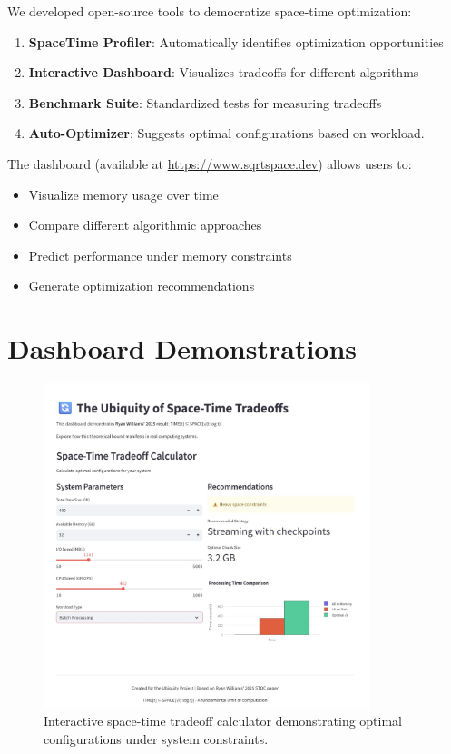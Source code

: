 \documentclass[11pt]{article}
\theoremstyle{definition}
\begin{document}
We developed open-source tools to democratize space-time optimization:

\begin{enumerate}
\item \textbf{SpaceTime Profiler}: Automatically identifies optimization opportunities
\item \textbf{Interactive Dashboard}: Visualizes tradeoffs for different algorithms
\item \textbf{Benchmark Suite}: Standardized tests for measuring tradeoffs
\item \textbf{Auto-Optimizer}: Suggests optimal configurations based on workload.
\end{enumerate}

The dashboard (available at \url{https://www.sqrtspace.dev}) allows users to:
\begin{itemize}
\item Visualize memory usage over time
\item Compare different algorithmic approaches
\item Predict performance under memory constraints
\item Generate optimization recommendations
\end{itemize}
\newpage
\FloatBarrier
\section{Dashboard Demonstrations}
\label{sec:dashboard}

\begin{figure}[!htbp]
\centering
\includegraphics[width=0.85\textwidth]{figures/dashboard1.png}
\caption{Interactive space-time tradeoff calculator demonstrating optimal configurations under system constraints.}
\label{fig:calc_dashboard}
\end{figure}
\end{document}
